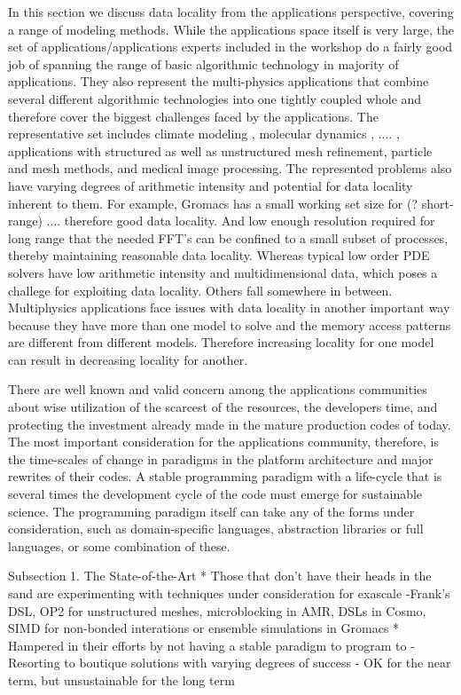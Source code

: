 In this section we discuss data locality from the applications
perspective, covering a range of modeling methods. While the
applications space itself is very large, the set of
applications/applications experts included in the workshop do a fairly
good job of spanning the range of basic algorithmic technology in
majority of applications. They also represent the multi-physics
applications that combine several different algorithmic technologies
into one tightly coupled whole and therefore cover the biggest
challenges faced by the applications. The representative set
includes climate modeling \cite{cosmo},  molecular dynamics
\cite{gromacs}, .... , applications with structured \cite{chombo}  as well as
unstructured \cite{}  mesh refinement, particle and mesh methods, and
medical image processing. The represented problems also have varying degrees
of arithmetic intensity and potential for data locality inherent to
them. For example, Gromacs has a small working set size for (?
short-range) .... therefore good data locality. And low enough
resolution required for long range that the needed FFT's can be
confined to a small subset of processes, thereby maintaining
reasonable data locality. Whereas typical low order PDE solvers have
low arithmetic intensity and multidimensional data, which poses a
challege for exploiting data locality. Others fall somewhere in between.
Multiphysics applications face issues with data locality in another
important way because they have more than one model to solve and the  
memory access patterns are different from different models. Therefore
increasing locality for one model can result in decreasing locality
for another. 

There are well known and valid concern among the applications
communities about wise utilization of the scarcest of the resources,
the developers time, and protecting the investment already made in the
mature production codes of today. The most important consideration for
the applications community, therefore, is the time-scales of change in
paradigms in the platform architecture and major rewrites of their
codes. A stable programming paradigm with a life-cycle that is several 
times the development cycle of the code must emerge for sustainable
science. The programming paradigm itself can take any of the forms
under consideration, such as domain-specific languages, abstraction
libraries or full languages, or some combination of these. 
 
Subsection 1. The State-of-the-Art
* Those that don't have their heads in the sand are experimenting with
   techniques under consideration for exascale
   -Frank's DSL, OP2 for unstructured meshes, microblocking in AMR,
     DSLs in Cosmo, SIMD for non-bonded interations or ensemble
     simulations in Gromacs 
* Hampered in their efforts by not having a stable paradigm to program
  to 
   - Resorting to boutique solutions with varying degrees of success
   - OK for the near term, but unsustainable for the long term

